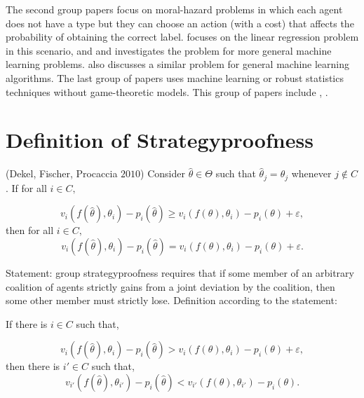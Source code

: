 \documentclass{article}
\begin{document}
The second group papers focus on moral-hazard problems in which each agent does not have a type but they can choose an action (with a cost) that affects the probability of obtaining the correct label. \citet*{richardsonprivately} focuses on the linear regression problem in this scenario, and \citet*{cai2015optimum} and \citet*{shah2016double} investigates the problem for more general machine learning problems. \citet*{mihailescu2010strategy} also discusses a similar problem for general machine learning algorithms.
\newline \newline
The last group of papers uses machine learning or robust statistics techniques without game-theoretic models. This group of papers include \citet*{dekel2009vox}, \citet*{dekel2009good}.
\newline \newline



\section{Definition of Strategyproofness} 
\begin{df} \label{df:sp1} 
(Dekel, Fischer, Procaccia $2010$) Consider $\hat{\theta} \in \Theta$ such that $\hat{\theta}_{j} = \theta_{j}$ whenever $j  \notin C $. If for all $i  \in C, $
\end{df}
\begin{equation} 
v_{i}\left(f\left(\hat{\theta}\right), \theta_{i}\right) - p_{i}\left(\hat{\theta}\right) \geq  v_{i}\left(f\left(\theta\right), \theta_{i}\right) - p_{i}\left(\theta\right) + \varepsilon,
\end{equation}
then for all $i  \in C, $
\begin{equation} 
v_{i}\left(f\left(\hat{\theta}\right), \theta_{i}\right) - p_{i}\left(\hat{\theta}\right) = v_{i}\left(f\left(\theta\right), \theta_{i}\right) - p_{i}\left(\theta\right) + \varepsilon.
\end{equation}

Statement: group strategyproofness requires that if some member of an arbitrary coalition of agents strictly gains from a joint deviation by the coalition, then some other member must strictly lose.
\newline \newline
Definition according to the statement:
\begin{df} \label{df:sp1p} 
If there is $i  \in C $ such that,
\end{df}
\begin{equation} 
v_{i}\left(f\left(\hat{\theta}\right), \theta_{i}\right) - p_{i}\left(\hat{\theta}\right) > v_{i}\left(f\left(\theta\right), \theta_{i}\right) - p_{i}\left(\theta\right) + \varepsilon,
\end{equation}
then there is $i' \in C $ such that,
\begin{equation} 
v_{i'}\left(f\left(\hat{\theta}\right), \theta_{i'}\right) - p_{i}\left(\hat{\theta}\right) < v_{i'}\left(f\left(\theta\right), \theta_{i'}\right) - p_{i}\left(\theta\right).
\end{equation}
\end{document}
